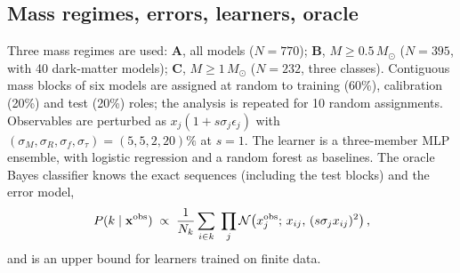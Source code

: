 \documentclass[11pt,a4paper]{article}
\newcommand{\Msun}{M_\odot}
\begin{document}
\subsection*{Mass regimes, errors, learners, oracle}
Three mass regimes are used: \textbf{A}, all models ($N=770$); \textbf{B}, $M\ge0.5\,\Msun$ ($N=395$, with 40 dark-matter models); \textbf{C}, $M\ge1\,\Msun$ ($N=232$, three classes). Contiguous mass blocks of six models are assigned at random to training (60\%), calibration (20\%) and test (20\%) roles; the analysis is repeated for 10 random assignments. Observables are perturbed as $x_j(1+s\sigma_j\epsilon_j)$ with $(\sigma_M,\sigma_R,\sigma_f,\sigma_\tau)=(5,5,2,20)\%$ at $s=1$. The learner is a three-member MLP ensemble, with logistic regression and a random forest as baselines. The oracle Bayes classifier knows the exact sequences (including the test blocks) and the error model,
\begin{equation}
P(k\mid\mathbf x^{\rm obs})\;\propto\;\frac1{N_k}\sum_{i\in k}\;\prod_j \mathcal N\!\left(x^{\rm obs}_j;\,x_{ij},\,(s\sigma_j x_{ij})^2\right),
\end{equation}
and is an upper bound for learners trained on finite data.
\end{document}
